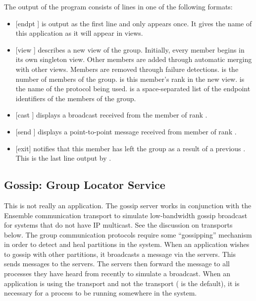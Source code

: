 The output of the program consists of lines in one of the following formats:
\begin{itemize}
\item
{[endpt ]} is output as the first line and only
appears once.  It gives the name of this application as it will appear
in views.

\item
{[view   ]} describes a
new view of the group.  Initially, every member begins in its own
singleton view.  Other members are added through automatic merging
with other views.  Members are removed through failure detections.
 is the number of members of the group.
 is this member's rank in the new view.
 is the name of the protocol being used.  
is a space-separated list of the endpoint identifiers of the members
of the group.

\item 
{[cast  ]} displays a broadcast received from
the member of rank .
\item
{[send  ]} displays a point-to-point message
received from member of rank .
\item
{[exit]} notifies that this member has left the group as a result of a
previous .  This is the last line output by
.
\end{itemize}

\subsection{Gossip: Group Locator Service}
This is not really an application.  The gossip server works in
conjunction with the Ensemble  communication transport to
simulate low-bandwidth gossip broadcast for systems that do not have
IP multicast.  See the discussion on transports below.  The group
communication protocols require some ``gossipping'' mechanism in order
to detect and heal partitions in the system.  When an application
wishes to gossip with other partitions, it broadcasts a message via
the  servers.  This sends messages to the 
servers.  The  servers then forward the message to all
processes they have heard from recently to simulate a broadcast.  When
an application is using the  transport and not the
 transport ( is the default), it is
necessary for a  process to be running somewhere in the
system.

